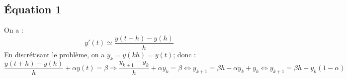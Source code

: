 \begin{corrigebox}
\subsection*{Équation 1}
On a :
$$
y'(t) \simeq \dfrac{y(t+h)-y(h)}{h}
$$
En discrétisant le problème, on a $y_k=y(kh)=y(t)$; donc : 
$$
\dfrac{y(t+h)-y(h)}{h} + \alpha y(t) = \beta \Longrightarrow 
\dfrac{y_{k+1}-y_k}{h} + \alpha y_k = \beta \Longleftrightarrow 
y_{k+1}  = \beta h - \alpha y_k + y_k \Longleftrightarrow 
y_{k+1}  = \beta h + y_k\left(1 - \alpha \right) 
$$
\end{corrigebox}
